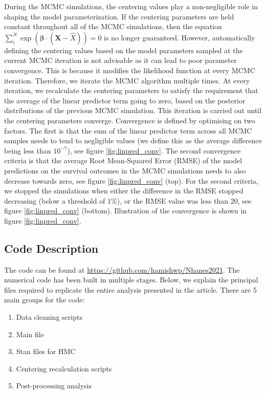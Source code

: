 \documentclass[
]{article}
\providecommand{\tightlist}{%
  \setlength{\itemsep}{0pt}\setlength{\parskip}{0pt}}
\begin{document}
During the MCMC simulations, the centering values play a non-negligible
role in shaping the model parameterization. If the centering parameters
are held constant throughout all of the MCMC simulations, then the
equation
\(\sum_i^N \exp{(\boldsymbol{\beta}\cdot(\boldsymbol{X}-\hat{X}))}=0\)
is no longer guaranteed. However, automatically defining the centering
values based on the model parameters sampled at the current MCMC
iteration is not advisable as it can lead to poor parameter convergence.
This is because it modifies the likelihood function at every MCMC
iteration. Therefore, we iterate the MCMC algorithm multiple times. At
every iteration, we recalculate the centering parameters to satisfy the
requirement that the average of the linear predictor term going to zero,
based on the posterior distributions of the previous MCMC simulation.
This iteration is carried out until the centering parameters converge.
Convergence is defined by optimising on two factors. The first is that
the sum of the linear predictor term across all MCMC samples needs to
tend to negligible values (we define this as the average difference
being less than \(10^{-7}\)), see figure \ref{fig:linpred_conv}. The
second convergence criteria is that the average Root Mean-Squared Error
(RMSE) of the model predictions on the survival outcomes in the MCMC
simulations needs to also decrease towards zero, see figure
\ref{fig:linpred_conv} (top). For the second criteria, we stopped the
simulations when either the difference in the RMSE stopped decreasing
(below a threshold of \(1\%\)), or the RMSE value was less than 20, see
figure \ref{fig:linpred_conv} (bottom). Illustration of the convergence
is shown in figure \ref{fig:linpred_conv}.

\hypertarget{code-description}{%
\subsection{Code Description}\label{code-description}}

The code can be found at \url{https://github.com/hamishwp/Nhanes2021}.
The numerical code has been built in multiple stages. Below, we explain
the principal files required to replicate the entire analysis presented
in the article. There are 5 main groups for the code:

\begin{enumerate}
\def\labelenumi{\arabic{enumi}.}
\tightlist
\item
  Data cleaning scripts
\item
  Main file
\item
  Stan files for HMC
\item
  Centering recalculation scripts
\item
  Post-processing analysis
\end{enumerate}
\end{document}
